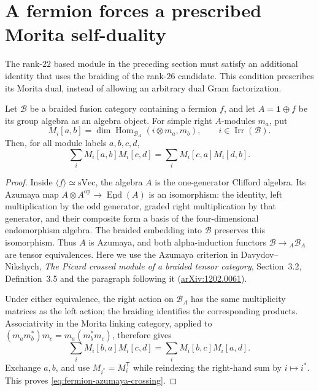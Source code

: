 \section{A fermion forces a prescribed Morita self-duality}
\label{sec:fermion-azumaya-crossing}

The rank-$22$ based module in the preceding section must satisfy an
additional identity that uses the braiding of the rank-$26$ candidate.
This condition prescribes its Morita dual, instead of allowing an
arbitrary dual Gram factorization.

\begin{lemma}
\label{lem:fermion-azumaya-crossing}
Let $\mathcal B$ be a braided fusion category containing a fermion $f$,
and let $A=\mathbf1\oplus f$ be its group algebra as an algebra object.
For simple right $A$-modules $m_a$, put
\[
 M_i[a,b]=\dim\operatorname{Hom}_{\mathcal B_A}(i\otimes m_a,m_b),
 \qquad i\in\operatorname{Irr}(\mathcal B).
\]
Then, for all module labels $a,b,c,d$,
\begin{equation}
 \sum_i M_i[a,b]M_i[c,d]
 =\sum_i M_i[c,a]M_i[d,b].
 \label{eq:fermion-azumaya-crossing}
\end{equation}
\end{lemma}
\begin{proof}
Inside $\langle f\rangle\simeq\mathrm{sVec}$, the algebra $A$ is the
one-generator Clifford algebra.  Its Azumaya map
$A\otimes A^{\mathrm{op}}\longrightarrow\underline{\operatorname{End}}(A)$
is an isomorphism: the identity, left multiplication by the odd generator,
graded right multiplication by that generator, and their composite form
a basis of the four-dimensional endomorphism algebra.  The braided
embedding into $\mathcal B$ preserves this isomorphism.  Thus $A$ is
Azumaya, and both alpha-induction functors
$\mathcal B\longrightarrow {}_A\mathcal B_A$ are tensor equivalences.
Here we use the Azumaya criterion in Davydov--Nikshych,
\emph{The Picard crossed module of a braided tensor category},
Section~3.2, Definition~3.5 and the paragraph following it
(\href{https://arxiv.org/abs/1202.0061}{arXiv:1202.0061}).

Under either equivalence, the right action on $\mathcal B_A$ has the
same multiplicity matrices as the left action; the braiding identifies
the corresponding products.  Associativity in the Morita linking
category, applied to $(m_a m_b^*)m_c=m_a(m_b^*m_c)$, therefore gives
\[
 \sum_i M_i[b,a]M_i[c,d]
 =\sum_i M_i[b,c]M_i[a,d].
\]
Exchange $a,b$, and use $M_{i^*}=M_i^{\mathsf T}$ while reindexing the
right-hand sum by $i\mapsto i^*$.  This proves
\eqref{eq:fermion-azumaya-crossing}.
\end{proof}

